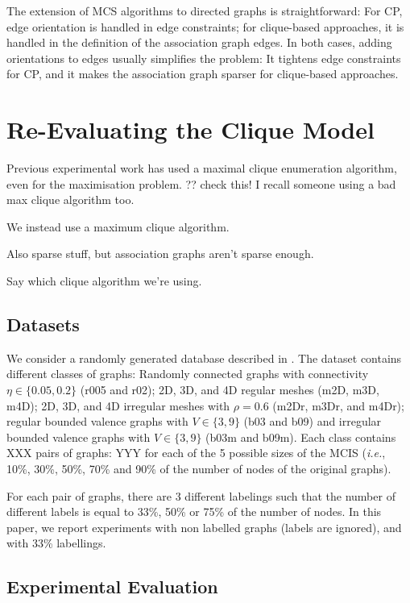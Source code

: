 \documentclass{llncs}
\begin{document}
The extension of MCS algorithms to directed graphs is straightforward: For CP, edge orientation is handled in edge constraints; for clique-based approaches, it is handled in the definition of the association graph edges. In both cases, adding orientations to edges usually simplifies the problem: It tightens edge constraints for CP, and it makes the association graph sparser for  clique-based approaches.


\section{Re-Evaluating the Clique Model}\label{eval1}



Previous experimental work has used a maximal clique enumeration algorithm, even for the
maximisation problem. ?? check this! I recall someone using a bad max clique algorithm too.
\cite{DBLP:conf/sspr/BunkeFGSV02,DBLP:journals/jgaa/ConteFV07}

We instead use a maximum clique algorithm.

Also sparse stuff, but association graphs aren't sparse enough.

Say which clique algorithm we're using.


\subsection{Datasets}

We consider a randomly generated database described in \cite{DBLP:journals/prl/SantoFSV03,DBLP:journals/jgaa/ConteFV07}. 
The dataset contains different classes of graphs: Randomly connected graphs with connectivity $\eta\in\{0.05,0.2\}$ (r005 and r02); 2D, 3D, and 4D regular meshes (m2D, m3D, m4D); 2D, 3D, and 4D irregular meshes with $\rho=0.6$ (m2Dr, m3Dr, and m4Dr); regular bounded valence graphs with $V\in\{3,9\}$ (b03 and b09) and irregular bounded valence graphs with $V\in\{3,9\}$ (b03m and b09m). Each class contains XXX pairs of graphs: YYY for each of the 5 possible sizes of the MCIS ({\em i.e.}, 10\%, 30\%, 50\%, 70\% and 90\% of the number of nodes of the original graphs). 

For each pair of graphs, there are 3 different labelings such that the number of different labels is equal to 33\%, 50\% or 75\% of the number of nodes. In this paper, we report experiments with non labelled graphs (labels are ignored), and with 33\% labellings.


\subsection{Experimental Evaluation}
\end{document}
